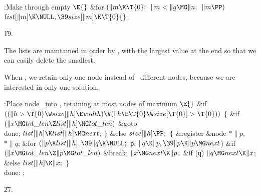 \B{}:Make  through  empty%
\X${}\E{}$\6
\&{for} ${}(\|m\K\T{0};{}$ ${}\|m<\|g\MG\|n;{}$ ${}\|m\PP){}$\1\5
${}\\{list}[\|m]\K\NULL,\39\\{size}[\|m]\K\T{0}{}$;\2\par
\U19.\fi

The lists are maintained in order by , with the largest
 value at the end so that we can easily delete the smallest.

When , we retain only one node instead of~
different nodes,
because we are interested in only one solution.

\Y\B\4:Place node~ into , retaining at most  nodes of maximum \X${}\E{}$\6
\&{if} ${}((\|h>\T{0}\W\\{size}[\|h]\E\\{width})\V(\|h\E\T{0}\W\\{size}[\T{0}]>%
\T{0})){}$\5
${}\{{}$\1\6
\&{if} ${}(\|x\MG\\{tot\_len}\Z\\{list}[\|h]\MG\\{tot\_len}){}$\1\5
\&{goto} \\{done};\2\6
${}\\{list}[\|h]\K\\{list}[\|h]\MG\\{next}{}$;\6
\4${}\}{}$\5
\2\&{else}\1\5
${}\\{size}[\|h]\PP;{}$\2\6
${}\{{}$\5
\1\&{register} \&{node} ${}{*}\|p,{}$ ${}{*}\|q{}$;\7
\&{for} ${}(\|p\K\\{list}[\|h],\39\|q\K\NULL;{}$ \|p; ${}\|q\K\|p,\39\|p\K\|p%
\MG\\{next}{}$)\5
\1\&{if} ${}(\|x\MG\\{tot\_len}\Z\|p\MG\\{tot\_len}){}$\1\5
\&{break};\2\2\6
${}\|x\MG\\{next}\K\|p;{}$\6
\&{if} (\|q)\1\5
${}\|q\MG\\{next}\K\|x{}$;\5
\2\&{else}\1\5
${}\\{list}[\|h]\K\|x;{}$\2\6
\4${}\}{}$\2\6
\4\\{done}:\5
;\par
\U27.\fi

